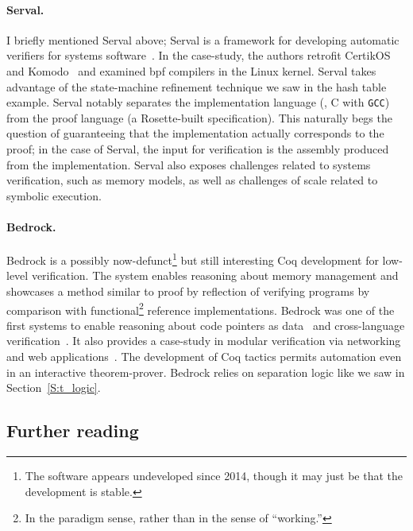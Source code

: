 \paragraph{Serval.} I briefly mentioned Serval above; Serval is a framework for
developing automatic verifiers for systems software~\cite{Nelson_2019}. In the
case-study, the authors retrofit CertikOS~\cite{199344} and
Komodo~\cite{Ferraiuolo_2017} and examined \gls{bpf} compilers in the Linux
kernel. Serval takes advantage of the state-machine refinement technique we saw
in the hash table example. Serval notably separates the implementation language
(\eg, C with \texttt{GCC}) from the proof language (a Rosette-built
specification). This naturally begs the question of guaranteeing that the
implementation actually corresponds to the proof; in the case of Serval, the
input for verification is the assembly produced from the implementation. Serval
also exposes challenges related to systems verification, such as memory models,
as well as challenges of scale related to symbolic execution.

\paragraph{Bedrock.} Bedrock is a possibly now-defunct\footnote{The software
appears undeveloped since 2014, though it may just be that the development is
stable.} but still interesting Coq development for low-level verification. The
system enables reasoning about memory management and showcases a method similar
to proof by reflection of verifying programs by comparison with
functional\footnote{In the paradigm sense, rather than in the sense of
``working.''} reference implementations. Bedrock was one of the first systems to
enable reasoning about code pointers as data~\cite{Chlipala_2011} and
cross-language verification~\cite{Wang_2014}. It also provides a case-study in
modular verification via networking and web applications~\cite{Chlipala_2015}.
The development of Coq tactics permits automation even in an interactive
theorem-prover. Bedrock relies on separation logic like we saw in
Section~\ref{S:t_logic}.

\subsection{Further reading}\label{S:ex_reading}

